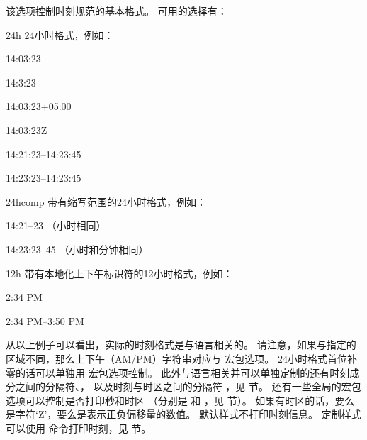 \begin{optionlist}
该选项控制时刻规范的基本格式。
可用的选择有：

\begin{valuelist}
	\item[24h] %
	24小时格式，例如：\par
	14:03:23\par
	14:3:23\par
	14:03:23+05:00\par
	14:03:23Z\par
	14:21:23--14:23:45\par
	14:23:23--14:23:45\par
	\item[24hcomp] %
	带有缩写范围的24小时格式，例如：\par
	14:21--23 （小时相同）\par %
	14:23:23--45 （小时和分钟相同）\par %
	\item[12h] %
	带有本地化上下午标识符的12小时格式，例如：\par
	2:34 PM\par
	2:34 PM--3:50 PM\par
\end{valuelist}
%
从以上例子可以看出，实际的时刻格式是与语言相关的。
请注意，如果与指定的区域不同，那么上下午（AM/PM）字符串对应与  宏包选项。
24小时格式首位补零的话可以单独用  宏包选项控制。
此外与语言相关并可以单独定制的还有时刻成分之间的分隔符、，
以及时刻与时区之间的分隔符 ，见  节。
还有一些全局的宏包选项可以控制是否打印秒和时区
（分别是  和 ，见  节）。
如果有时区的话，要么是字符`Z'，要么是表示正负偏移量的数值。
默认样式不打印时刻信息。
定制样式可以使用  命令打印时刻，见  节。


\end{optionlist}
